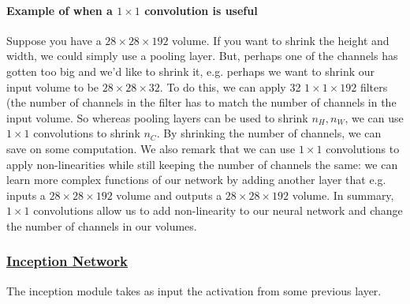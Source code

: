 \documentclass[12pt]{article}
\begin{document}
\paragraph{Example of when a $1\times 1$ convolution is useful}
 Suppose you have a $28 \times 28 \times 192$ volume. If you want to shrink the height and width, we could simply use
a pooling layer. But, perhaps one of the channels has gotten too big and we'd like to shrink it, e.g. perhaps we want to shrink
our input volume to be $28 \times 28 \times 32$. To do this, we can apply 32 $1 \times 1 \times 192$ filters (the number of channels in the filter has to match the number of channels in the input volume. So whereas pooling layers can be used to shrink $n_H, n_W$,
we can use $1 \times 1$ convolutions to shrink $n_C$. By shrinking the number of channels, we can save on some computation. We also remark that we can use $1 \times 1$ convolutions to apply non-linearities while still keeping the number of channels the same:
we can learn more complex functions of our network by adding another layer that e.g. inputs a $28 \times 28 \times 192$ volume and outputs a $28 \times 28 \times 192$ volume. In summary, $1 \times 1$ convolutions allow us to add non-linearity to our neural network and change the number of channels in our volumes.

\subsubsection{\href{https://arxiv.org/abs/1409.4842}{Inception Network}}
The inception module takes as input the activation from some previous layer.
\end{document}
